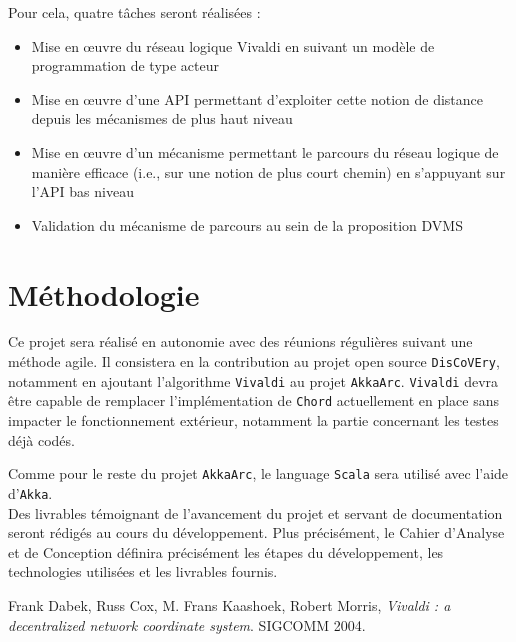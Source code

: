 \documentclass[11pt,a4paper]{article}
\begin{document}
Pour cela, quatre tâches seront réalisées :
\begin{itemize}
\item Mise en \oe uvre du réseau logique Vivaldi en suivant un modèle de programmation de type acteur
\item Mise en \oe uvre d’une API permettant d’exploiter cette notion de distance
depuis les mécanismes de plus haut niveau
\item Mise en \oe uvre d’un mécanisme permettant le parcours du réseau logique de manière efficace (i.e., sur une notion de plus court chemin) en s’appuyant sur l’API bas niveau
\item Validation du mécanisme de parcours au sein de la proposition DVMS
\end{itemize}

\section{Méthodologie}
Ce projet sera réalisé en autonomie avec des réunions régulières suivant une méthode agile. Il consistera en la contribution au projet open source \texttt{DisCoVEry}, notamment en ajoutant l'algorithme \texttt{Vivaldi} au projet \texttt{AkkaArc}. \texttt{Vivaldi} devra être capable de remplacer l'implémentation de \texttt{Chord} actuellement en place sans impacter le fonctionnement extérieur, notamment la partie concernant les testes déjà codés.

Comme pour le reste du projet \texttt{AkkaArc}, le language \texttt{Scala} sera utilisé avec l'aide d'\texttt{Akka}.\\

Des livrables témoignant de l'avancement du projet et servant de documentation seront rédigés au cours du développement.
Plus précisément, le Cahier d'Analyse et de Conception définira précisément les étapes du développement, les technologies utilisées et les livrables fournis.

\begin{thebibliography}{9}

  Frank Dabek, Russ Cox, M. Frans Kaashoek, Robert Morris,
  \emph{Vivaldi : a decentralized network coordinate system}.
  SIGCOMM 2004.

\end{thebibliography}
\end{document}
